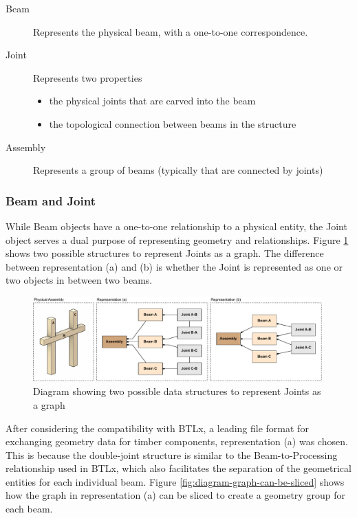 \begin{description}
    \item [Beam] Represents the physical beam, with a one-to-one correspondence.
    \item [Joint] Represents two properties 
    \begin{itemize}
        \item the physical joints that are carved into the beam
        \item the topological connection between beams in the structure
    \end{itemize}
    \item [Assembly] Represents a group of beams (typically that are connected by joints)
\end{description}

\subsubsection{Beam and Joint}
\label{subsubsection:exploration-2-beam-and-joint}

While Beam objects have a one-to-one relationship to a physical entity, the Joint object serves a dual purpose of representing geometry and relationships. Figure \ref{fig:diagram-two-possible-data-structures} shows two possible structures to represent Joints as a graph. The difference between representation (a) and (b) is whether the Joint is represented as one or two objects in between two beams.

\begin{figure}[!h]
    \centering
    \includegraphics[width=0.99\textwidth]{images/05/image59.pdf}
    \caption{Diagram showing two possible data structures to represent Joints as a graph}
    \label{fig:diagram-two-possible-data-structures}
\end{figure}



After considering the compatibility with BTLx, a leading file format for exchanging geometry data for timber components, representation (a) was chosen. This is because the double-joint structure is similar to the Beam-to-Processing relationship used in BTLx, which also facilitates the separation of the geometrical entities for each individual beam. Figure \ref{fig:diagram-graph-can-be-sliced} shows how the graph in representation (a) can be sliced to create a geometry group for each beam.


